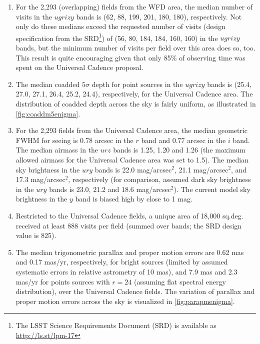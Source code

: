 \begin{enumerate}
{is due to continuing improvements in the system performance estimates.}.
These values are shallower than
the zenith dark time values for two main reasons: the sky is expected to be
brighter for non-dark time and away from zenith, the sky brightness model
currently implemented in \OpSim has some shortcomings (a new model will
be implemented in version 4), and the moon avoidance is not as aggressive
as it could be. As a result, the limiting depths above are biased bright by close
to 1 mag in the $z$ and $y$ bands, and a few tenths of a magnitude in the
$u$, $g$ and $i$ bands. The co-added depths are tied to single-visit bands,
and suffer from the same bias.
\item For the 2,293 (overlapping) fields from the WFD area,
the median number of visits in the $ugrizy$ bands is (62, 88, 199, 201, 180,
180), respectively. Not only do these medians exceed the requested
number of visits (design specification from the SRD\footnote{The LSST
Science Requirements Document (SRD) is available as
\url{http://ls.st/lpm-17}}) of (56, 80, 184, 184, 160, 160) in the $ugrizy$
bands, but the minimum number of visits per field over this area does
so, too. This result is quite encouraging given that
only 85\% of observing time was spent on the Universal Cadence proposal.
\item The median coadded $5\sigma$ depth
for point sources in the $ugrizy$ bands is (25.4, 27.0, 27.1, 26.4,
25.2, 24.4), respectively, for the Universal Cadence area. The distribution
of coadded depth across the sky is fairly uniform, as illustrated in \autoref{fig:coaddm5enigma}.
\item For the 2,293 fields from the Universal Cadence area, the median
geometric FWHM for seeing is 0.78 arcsec in the $r$ band and 0.77 arcsec
in the $i$ band. The median airmass in the $urz$ bands is 1.25, 1.20 and 1.26
(the maximum allowed airmass for the Universal Cadence area was set to
1.5).  The median sky brightness in the $ury$ bands is 22.0 mag/arcsec$^2$,
21.1 mag/arcsec$^2$, and 17.3 mag/arcsec$^2$, respectively (for comparison,
assumed dark sky brightness in the $ury$ bands is 23.0, 21.2 and 18.6
mag/arcsec$^2$).  The current model sky brightness in the $y$ band is biased
high by close to 1 mag.
\item Restricted to the Universal Cadence fields, a unique area of
18,000 sq.deg. received at least 888 visits per field (summed over bands;
the SRD design value is 825).
\item The median trigonometric parallax and proper motion errors are
0.62 mas and 0.17 mas/yr, respectively, for bright sources (limited by
assumed systematic errors in relative astrometry of 10 mas), and 7.9
mas and 2.3 mas/yr for points sources with $r=24$ (assuming flat
spectral energy distribution), over the Universal Cadence fields. The
variation of parallax and proper motion errors across the sky is
visualized in \autoref{fig:parapmenigma}.
\end{enumerate}





